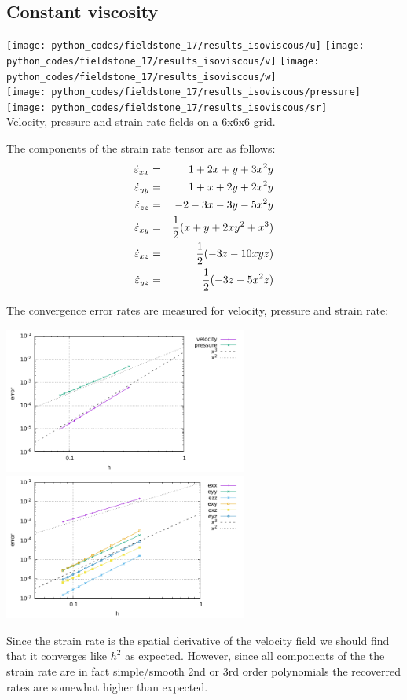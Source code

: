 \subsection*{Constant viscosity}

\begin{center}
\texttt{[image: python\_codes/fieldstone\_17/results\_isoviscous/u]}
\texttt{[image: python\_codes/fieldstone\_17/results\_isoviscous/v]}
\texttt{[image: python\_codes/fieldstone\_17/results\_isoviscous/w]}\\
\texttt{[image: python\_codes/fieldstone\_17/results\_isoviscous/pressure]}
\texttt{[image: python\_codes/fieldstone\_17/results\_isoviscous/sr]}\\
{\captionfont Velocity, pressure and strain rate fields on a 6x6x6 grid.}
\end{center}

The components of the strain rate tensor are as follows:
\begin{eqnarray}
\dot{\varepsilon}_{xx}&=& 1+2x+y+3x^2y  \nonumber\\
\dot{\varepsilon}_{yy}&=& 1+x+2y+2x^2y \nonumber\\
\dot{\varepsilon}_{zz}&=& -2-3x-3y-5x^2y \nonumber\\
\dot{\varepsilon}_{xy}&=& \frac12 (x+y+2xy^2+x^3) \nonumber\\
\dot{\varepsilon}_{xz}&=& \frac12( -3z -10xyz ) \nonumber\\
\dot{\varepsilon}_{yz}&=& \frac12 ( -3z-5x^2z  ) \nonumber
\end{eqnarray}

The convergence error rates are measured for velocity, pressure and strain rate:
\begin{center}
\includegraphics[width=8cm]{python_codes/fieldstone_17/results_isoviscous/errors.pdf}
\includegraphics[width=8cm]{python_codes/fieldstone_17/results_isoviscous/errors_sr.pdf}
\end{center}
Since the strain rate is the spatial derivative of the velocity field we should 
find that it converges like $h^2$ as expected. However, since all components of the 
the strain rate are in fact simple/smooth 2nd or 3rd order polynomials the 
recoverred rates are somewhat higher than expected.

